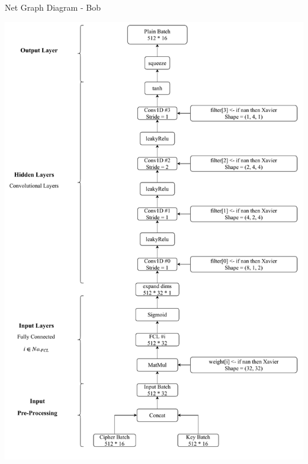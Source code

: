 \documentclass[a4paper, 12pt]{report}
\begin{document}
\begin{blockfigure}{ Net Graph Diagram - Bob}
	\begin{center}
		\includegraphics[width = \textwidth]{Bob-Diagram}
	\end{center}
\end{blockfigure}
\newpage
\end{document}
